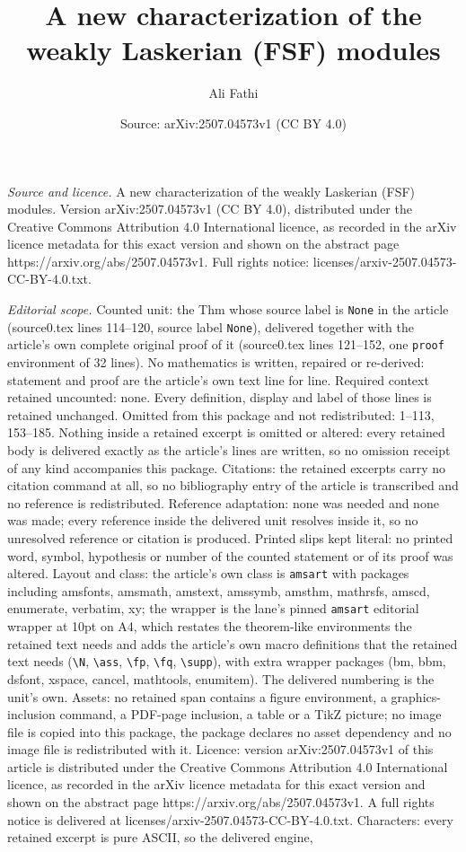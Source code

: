 \documentclass[10pt,a4paper]{amsart}
\title[A new characterization of the weakly Laskerian (FSF) modules]{A new characterization of the weakly Laskerian (FSF) modules}
\author{Ali Fathi}
\date{Source: arXiv:2507.04573v1 (CC BY 4.0)}
\begin{document}
\maketitle

\noindent\emph{Source and licence.} A new characterization of the weakly Laskerian (FSF) modules. Version arXiv:2507.04573v1 (CC BY 4.0), distributed under the Creative Commons Attribution 4.0 International licence, as recorded in the arXiv licence metadata for this exact version and shown on the abstract page https://arxiv.org/abs/2507.04573v1. Full rights notice: licenses/arxiv-2507.04573-CC-BY-4.0.txt.\par\smallskip

\noindent\textit{Editorial scope.} Counted unit: the Thm whose source label is \texttt{None} in the article (source0.tex lines 114--120, source label \texttt{None}), delivered together with the article's own complete original proof of it (source0.tex lines 121--152, one \texttt{proof} environment of 32 lines). No mathematics is written, repaired or re-derived: statement and proof are the article's own text line for line. Required context retained uncounted: none. Every definition, display and label of those lines is retained unchanged. Omitted from this package and not redistributed: 1--113, 153--185. Nothing inside a retained excerpt is omitted or altered: every retained body is delivered exactly as the article's lines are written, so no omission receipt of any kind accompanies this package. Citations: the retained excerpts carry no citation command at all, so no bibliography entry of the article is transcribed and no reference is redistributed. Reference adaptation: none was needed and none was made; every reference inside the delivered unit resolves inside it, so no unresolved reference or citation is produced. Printed slips kept literal: no printed word, symbol, hypothesis or number of the counted statement or of its proof was altered. Layout and class: the article's own class is \texttt{amsart} with packages including amsfonts, amsmath, amstext, amssymb, amsthm, mathrsfs, amscd, enumerate, verbatim, xy; the wrapper is the lane's pinned \texttt{amsart} editorial wrapper at 10pt on A4, which restates the theorem-like environments the retained text needs and adds the article's own macro definitions that the retained text needs (\texttt{\textbackslash N}, \texttt{\textbackslash ass}, \texttt{\textbackslash fp}, \texttt{\textbackslash fq}, \texttt{\textbackslash supp}), with extra wrapper packages (bm, bbm, dsfont, xspace, cancel, mathtools, enumitem). The delivered numbering is the unit's own. Assets: no retained span contains a figure environment, a graphics-inclusion command, a PDF-page inclusion, a table or a TikZ picture; no image file is copied into this package, the package declares no asset dependency and no image file is redistributed with it. Licence: version arXiv:2507.04573v1 of this article is distributed under the Creative Commons Attribution 4.0 International licence, as recorded in the arXiv licence metadata for this exact version and shown on the abstract page https://arxiv.org/abs/2507.04573v1. A full rights notice is delivered at licenses/arxiv-2507.04573-CC-BY-4.0.txt. Characters: every retained excerpt is pure ASCII, so the delivered engine, 
\end{document}
